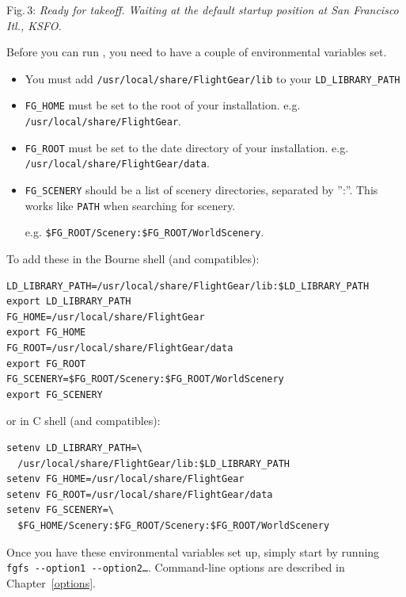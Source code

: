  \noindent
Fig.\,3: \textit{Ready for takeoff. Waiting at the default startup position at San
Francisco Itl., KSFO.}
\medskip

Before you can run \FlightGear{}, you need to have a couple of environmental variables set.

\begin{itemize}
\item You must add \texttt{/usr/local/share/FlightGear/lib} to your \texttt{LD\_LIBRARY\_PATH}
\item \texttt{FG\_HOME} must be set to the root of your \FlightGear{} installation. e.g. \texttt{/usr/local/share/FlightGear}.
\item \texttt{FG\_ROOT} must be set to the date directory of your \FlightGear{} installation. e.g. \texttt{/usr/local/share/FlightGear/data}.
\item \texttt{FG\_SCENERY} should be a list of scenery directories, separated by '':''. This works like \texttt{PATH} when searching for scenery. 

e.g. \texttt{\$FG\_ROOT/Scenery:\$FG\_ROOT/WorldScenery}.
\end{itemize}

\noindent
To add these in the Bourne shell (and compatibles):
\begin{verbatim}
LD_LIBRARY_PATH=/usr/local/share/FlightGear/lib:$LD_LIBRARY_PATH
export LD_LIBRARY_PATH
FG_HOME=/usr/local/share/FlightGear
export FG_HOME
FG_ROOT=/usr/local/share/FlightGear/data
export FG_ROOT
FG_SCENERY=$FG_ROOT/Scenery:$FG_ROOT/WorldScenery
export FG_SCENERY
\end{verbatim}
\noindent
 or in C shell (and compatibles):
\begin{verbatim}
setenv LD_LIBRARY_PATH=\
  /usr/local/share/FlightGear/lib:$LD_LIBRARY_PATH
setenv FG_HOME=/usr/local/share/FlightGear
setenv FG_ROOT=/usr/local/share/FlightGear/data
setenv FG_SCENERY=\
  $FG_HOME/Scenery:$FG_ROOT/Scenery:$FG_ROOT/WorldScenery
\end{verbatim}
Once you have these environmental variables set up, simply start \FlightGear{} by running
\texttt{fgfs -$ $-option1 -$ $-option2\dots}.
\medskip
Command-line options are described in Chapter~\ref{options}.

